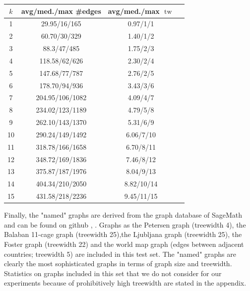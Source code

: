 \documentclass[11pt,a4paper]{article}
\DeclareMathOperator{\tw}{tw}
\begin{document}
\begin{center}
\begin{table}[h!]
\centering
\begin{tabular}{|c|c|c|c|}
\hline
$k$ & avg/med./max \#edges & avg/med./max $\tw$ \\
\hline \hline
1 & 29.95/16/165 & 0.97/1/1 \\
\hline
2 & 60.70/30/329 & 1.40/1/2 \\
\hline
3 & 88.3/47/485 & 1.75/2/3 \\
\hline
4 & 118.58/62/626 & 2.30/2/4 \\
\hline
5 & 147.68/77/787 & 2.76/2/5 \\
\hline
6 & 178.70/94/936 & 3.43/3/6 \\
\hline
7 & 204.95/106/1082 & 4.09/4/7 \\
\hline
8 & 234.02/123/1189 & 4.79/5/8 \\
\hline
9 & 262.10/143/1370 & 5.31/6/9 \\
\hline
10 & 290.24/149/1492 & 6.06/7/10 \\
\hline
11 & 318.78/166/1658 & 6.70/8/11 \\
\hline
12 & 348.72/169/1836 & 7.46/8/12 \\
\hline
13 & 375.87/187/1976 & 8.04/9/13 \\
\hline
14 & 404.34/210/2050 & 8.82/10/14 \\
\hline
15 & 431.58/218/2236 & 9.45/11/15 \\
\hline
\end{tabular}
\end{table}
\end{center}

Finally, the "named" graphs are derived from the graph database of SageMath and can be found on github \cite{sage}, \cite{named_graphs}. Graphs as the Petersen graph (treewidth 4), the Balaban 11-cage graph (treewidth 25),the Ljubljana graph (treewidth 25), the Foster graph (treewidth 22) and the world map graph (edges between adjacent countries; treewidth 5) are included in this test set. The "named" graphs are clearly the most sophisticated graphs in terms of graph size and treewidth. Statistics on graphs included in this set that we do not consider for our experiments because of prohibitively high treewidth are stated in the appendix. \\
\end{document}
